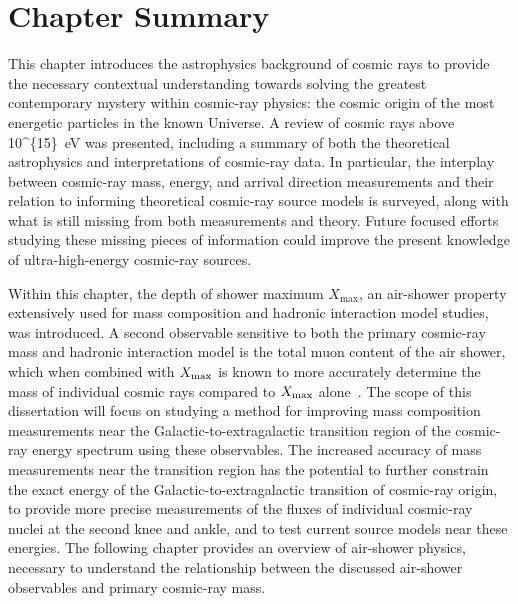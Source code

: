 \section{Chapter Summary}\label{sec:ch1_summary}
This chapter introduces the astrophysics background of cosmic rays to provide the necessary contextual understanding towards solving the greatest contemporary mystery within cosmic-ray physics: the cosmic origin of the most energetic particles in the known Universe.
A review of cosmic rays above \qty[parse-numbers=false]{10^{15}}{\electronvolt} was presented, including a summary of both the theoretical astrophysics and interpretations of cosmic-ray data.
In particular, the interplay between cosmic-ray mass, energy, and arrival direction measurements and their relation to informing theoretical cosmic-ray source models is surveyed, along with what is still missing from both measurements and theory.
Future focused efforts studying these missing pieces of information could improve the present knowledge of ultra-high-energy cosmic-ray sources.

Within this chapter, the depth of shower maximum $X_{\text{max}}$, an air-shower property extensively used for mass composition and hadronic interaction model studies, was introduced.
A second observable sensitive to both the primary cosmic-ray mass and hadronic interaction model is the total muon content of the air shower, which when combined with $X_{\rm max}$ is known to more accurately determine the mass of individual cosmic rays compared to $X_{\rm max}$ alone~\cite{holt_epjc2019_radiomuon}.
The scope of this dissertation will focus on studying a method for improving mass composition measurements near the Galactic-to-extragalactic transition region of the cosmic-ray energy spectrum using these observables.
The increased accuracy of mass measurements near the transition region has the potential to further constrain the exact energy of the Galactic-to-extragalactic transition of cosmic-ray origin, to provide more precise measurements of the fluxes of individual cosmic-ray nuclei at the second knee and ankle, and to test current source models near these energies.
The following chapter provides an overview of air-shower physics, necessary to understand the relationship between the discussed air-shower observables and primary cosmic-ray mass.




